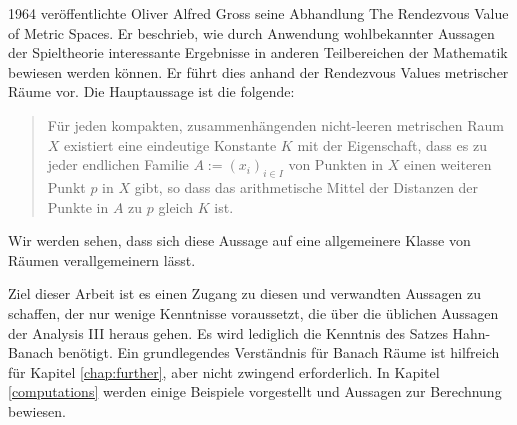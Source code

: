 	
\begin{zusammenfassung}
	1964 veröffentlichte Oliver Alfred Gross seine Abhandlung \glqq The Rendezvous Value of Metric Spaces\grqq \cite{gross}. Er beschrieb, wie durch Anwendung wohlbekannter Aussagen der Spieltheorie interessante Ergebnisse in anderen Teilbereichen der Mathematik bewiesen werden können. Er führt dies anhand der \glqq Rendezvous Values\grqq{} metrischer Räume vor.
	Die Hauptaussage ist die folgende:
	\begin{quotation}
		Für jeden kompakten, zusammenhängenden nicht-leeren metrischen Raum $X$ existiert eine eindeutige Konstante $K$ mit der Eigenschaft, dass es zu jeder endlichen Familie $A:=(x_i)_{i\in I}$ von Punkten in $X$ einen weiteren Punkt $p$ in $X$ gibt, so dass das arithmetische Mittel der Distanzen der Punkte in $A$ zu $p$ gleich $K$ ist.
	\end{quotation}
	Wir werden sehen, dass sich diese Aussage auf eine allgemeinere Klasse von Räumen verallgemeinern lässt.
	
	Ziel dieser Arbeit ist es einen Zugang zu diesen und verwandten Aussagen zu schaffen, der nur wenige Kenntnisse voraussetzt, die über die üblichen Aussagen der Analysis III heraus gehen. Es wird lediglich die Kenntnis des Satzes Hahn-Banach benötigt. Ein grundlegendes Verständnis für Banach Räume ist hilfreich für Kapitel \ref{chap:further}, aber nicht zwingend erforderlich. 
	In Kapitel \ref{computations} werden einige Beispiele vorgestellt und Aussagen zur Berechnung bewiesen.
\end{zusammenfassung}
